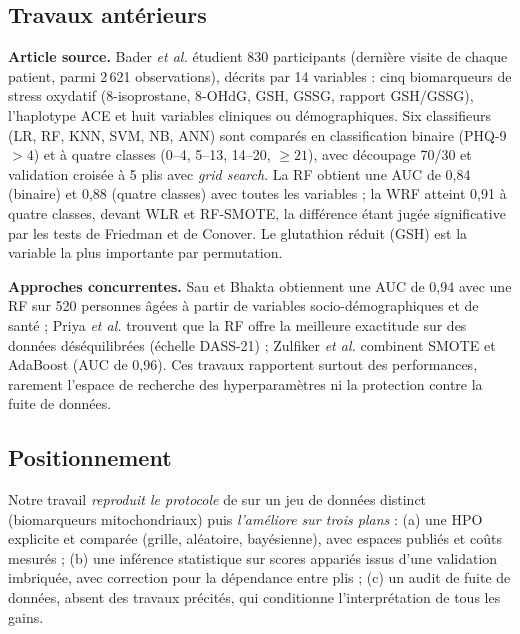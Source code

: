 \subsection{Travaux antérieurs}
\textbf{Article source.} Bader \emph{et al.} \cite{bader2024} étudient 830 participants (dernière visite de chaque patient, parmi 2\,621 observations), décrits par 14 variables : cinq biomarqueurs de stress oxydatif (8-isoprostane, 8-OHdG, GSH, GSSG, rapport GSH/GSSG), l'haplotype ACE et huit variables cliniques ou démographiques. Six classifieurs (LR, RF, KNN, SVM, NB, ANN) sont comparés en classification binaire (PHQ-9\,$>4$) et à quatre classes (0--4, 5--13, 14--20, $\geq 21$), avec découpage 70/30 et validation croisée à 5 plis avec \emph{grid search}. La RF obtient une AUC de 0,84 (binaire) et 0,88 (quatre classes) avec toutes les variables ; la WRF atteint 0,91 à quatre classes, devant WLR et RF-SMOTE, la différence étant jugée significative par les tests de Friedman et de Conover. Le glutathion réduit (GSH) est la variable la plus importante par permutation.

\textbf{Approches concurrentes.} Sau et Bhakta \cite{sau2017} obtiennent une AUC de 0,94 avec une RF sur 520 personnes âgées à partir de variables socio-démographiques et de santé ; Priya \emph{et al.} \cite{priya2020} trouvent que la RF offre la meilleure exactitude sur des données déséquilibrées (échelle DASS-21) ; Zulfiker \emph{et al.} \cite{zulfiker2021} combinent SMOTE et AdaBoost (AUC de 0,96). Ces travaux rapportent surtout des performances, rarement l'espace de recherche des hyperparamètres ni la protection contre la fuite de données.

\subsection{Positionnement}
Notre travail \emph{reproduit le protocole} de \cite{bader2024} sur un jeu de données distinct (biomarqueurs mitochondriaux) puis \emph{l'améliore sur trois plans} : (a) une HPO explicite et comparée (grille, aléatoire, bayésienne), avec espaces publiés et coûts mesurés ; (b) une inférence statistique sur scores appariés issus d'une validation imbriquée, avec correction pour la dépendance entre plis \cite{nadeau2003} ; (c) un audit de fuite de données, absent des travaux précités, qui conditionne l'interprétation de tous les gains.
